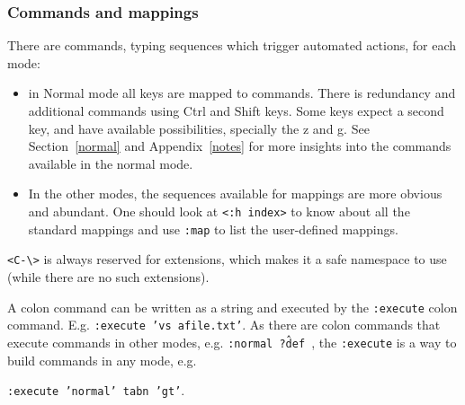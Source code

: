 \documentclass{article}
\newcommand{\ttt}[1] {
	\texttt{<#1>}}
\newcommand{\tttt}[1] {
	\texttt{#1}}
\begin{document}
\subsubsection{Commands and mappings}
There are commands, typing sequences which trigger automated actions,
for each mode:
\begin{itemize}
	\item in Normal mode all keys are mapped to commands.
		There is redundancy and additional commands
		using Ctrl and Shift keys.
		Some keys expect a second key,
		and have available possibilities,
		specially the z and g.
    See Section~\ref{normal} and Appendix~\ref{notes}
    for more insights into the commands available in the
    normal mode.
	\item In the other modes, the sequences available for mappings are more obvious and abundant.
		One should look at \ttt{:h index} to know about all the standard mappings
		and use \tttt{:map} to list the user-defined mappings.
\end{itemize}

\ttt{C-\textbackslash} is always reserved for extensions,
which makes it a safe namespace to use (while there are no
such extensions).

A colon command can be written as a string
and executed by the \tttt{:execute} colon command.
E.g. \tttt{:execute 'vs afile.txt'}.
As there are colon commands that execute commands in other
modes, e.g. \tttt{:normal ?\^def },
the \tttt{:execute} is a way to build commands in any mode,
e.g.
\tttt{:execute 'normal' tabn 'gt'}.
\end{document}
